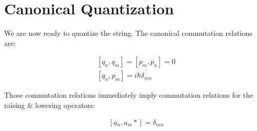 \section{Canonical Quantization}

We are now ready to quantize the string.  The canonical commutation relations are:

\begin{align}
    & [q_n, q_m] = [p_m, p_n] = 0 \\
    & [q_n, p_m] = i \hbar \delta_{nm}
\end{align}


Those commutation relations immediately imply commutation relations for the raising & lowering operators:

\begin{align}
    & [a_n, a_m *]= \delta_{mn}
\end{align}






